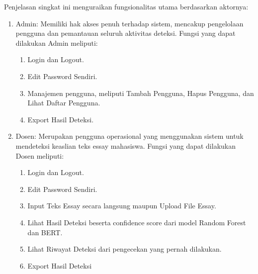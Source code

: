 Penjelasan singkat ini menguraikan fungsionalitas utama berdasarkan aktornya:
\begin{enumerate}[label=\arabic*., leftmargin=*]
  \item Admin: Memiliki hak akses penuh terhadap sistem, mencakup pengelolaan pengguna dan pemantauan seluruh aktivitas deteksi. Fungsi yang dapat dilakukan Admin meliputi:
    \begin{enumerate}[label=\alph*), leftmargin=*]
      \item Login dan Logout.
      \item Edit Password Sendiri.
      \item Manajemen pengguna, meliputi Tambah Pengguna, Hapus Pengguna, dan Lihat Daftar Pengguna.
      \item Export Hasil Deteksi.
    \end{enumerate}
  \item Dosen: Merupakan pengguna operasional yang menggunakan sistem untuk mendeteksi keaslian teks essay mahasiswa. Fungsi yang dapat dilakukan Dosen meliputi:
  \begin{enumerate}[label=\alph*), leftmargin=*]
      \item Login dan Logout.
      \item Edit Password Sendiri.
      \item Input Teks Essay secara langsung maupun Upload File Essay.
      \item Lihat Hasil Deteksi beserta confidence score dari model Random Forest dan BERT.
      \item Lihat Riwayat Deteksi dari pengecekan yang pernah dilakukan.
      \item Export Hasil Deteksi
    \end{enumerate}
\end{enumerate}
